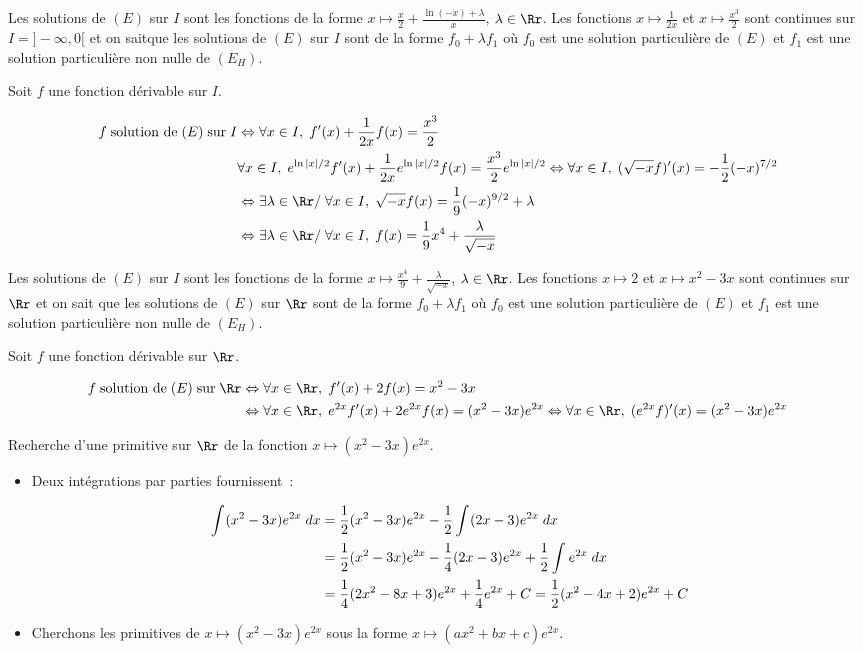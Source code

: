 {{Les solutions de $(E)$ sur  $I$ sont les fonctions de la forme $x\mapsto\frac{x}{2}+\frac{\ln(-x)+\lambda}{x}$,
$\lambda\in\Rr$.
Les fonctions $x\mapsto\frac{1}{2x}$ et $x\mapsto\frac{x^3}{2}$ sont continues sur $I=]-\infty,0[$ et on
saitque les solutions de $(E)$ sur $I$ sont de la forme
$f_0+\lambda f_1$ où $f_0$ est une solution particulière de $(E)$ et $f_1$ est une solution particulière non nulle de
$(E_H)$.

Soit $f$ une fonction dérivable sur $I$.

\begin{align*}\ensuremath
f\;\mbox{solution de}\;(E)\;\mbox{sur}\;I&\Leftrightarrow\forall x\in I,\;f'(x)+\frac{1}{2x}f(x)=\frac{x^3}{2}\\
 &\forall x\in I,\;e^{\ln|x|/2}f'(x)+\frac{1}{2x}e^{\ln|x|/2}f(x)=\frac{x^3}{2}e^{\ln|x|/2}\Leftrightarrow\forall x\in
I,\;(\sqrt{-x}f)'(x)=-\frac{1}{2}(-x)^{7/2}\\
 &\Leftrightarrow\exists\lambda\in\Rr/\;\forall x\in I,\;\sqrt{-x}f(x)=\frac{1}{9}(-x)^{9/2}+\lambda\\
 &\Leftrightarrow\exists\lambda\in\Rr/\;\forall x\in I,\;f(x)=\frac{1}{9}x^4+\frac{\lambda}{\sqrt{-x}}
\end{align*}

Les solutions de $(E)$ sur  $I$ sont les fonctions de la forme $x\mapsto\frac{x^4}{9}+\frac{\lambda}{\sqrt{-x}}$,
$\lambda\in\Rr$.
Les fonctions $x\mapsto2$ et $x\mapsto x^2-3x$ sont continues sur $\Rr$ et on sait
que les solutions de $(E)$ sur $\Rr$ sont de la forme
$f_0+\lambda f_1$ où $f_0$ est une solution particulière de $(E)$ et $f_1$ est une solution particulière non nulle de
$(E_H)$.

Soit $f$ une fonction dérivable sur $\Rr$.

\begin{align*}\ensuremath
f\;\mbox{solution de}\;(E)\;\mbox{sur}\;\Rr&\Leftrightarrow\forall x\in\Rr,\;f'(x)+2f(x)=x^2-3x\\
 &\Leftrightarrow\forall x\in\Rr,\;e^{2x}f'(x)+2e^{2x}f(x)=(x^2-3x)e^{2x}\Leftrightarrow\forall
x\in\Rr,\;(e^{2x}f)'(x)=(x^2-3x)e^{2x}
\end{align*}

Recherche d'une primitive sur ${\Rr}$ de la fonction $x\mapsto(x^2-3x)e^{2x}$.
\begin{itemize}
\item[\textbf{1ère méthode}.] Deux intégrations par parties fournissent~:

\begin{align*}\ensuremath
\int_{}^{}(x^2-3x)e^{2x}\;dx&=\frac{1}{2}(x^2-3x)e^{2x}-\frac{1}{2}\int_{}^{}(2x-3)e^{2x}\;dx\\
 &=\frac{1}{2}(x^2-3x)e^{2x}-\frac{1}{4}(2x-3)e^{2x}+\frac{1}{2}\int_{}^{}e^{2x}\;dx\\
 &=\frac{1}{4}(2x^2-8x+3)e^{2x}+\frac{1}{4}e^{2x}+C=\frac{1}{2}(x^2-4x+2)e^{2x}+C
\end{align*}
\item[\textbf{2ème méthode}.] Cherchons les primitives de $x\mapsto(x^2-3x)e^{2x}$ sous la forme
$x\mapsto(ax^2+bx+c)e^{2x}$.


\end{itemize}}}
